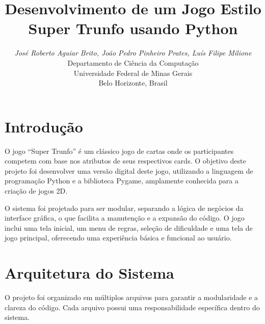 \documentclass[a4paper, twocolumn]{article}
\title{\textbf{Desenvolvimento de um Jogo Estilo Super Trunfo usando Python}}
\author{
  \textit{José Roberto Aguiar Brito, João Pedro Pinheiro Prates, Luís Filipe Milione} \\
  Departamento de Ciência da Computação \\
  Universidade Federal de Minas Gerais \\
  Belo Horizonte, Brasil \\
}
\date{} %
\begin{document}


\section{Introdução}
O jogo ``Super Trunfo'' é um clássico jogo de cartas onde os participantes competem com base nos atributos de seus respectivos cards. O objetivo deste projeto foi desenvolver uma versão digital deste jogo, utilizando a linguagem de programação Python e a biblioteca Pygame, amplamente conhecida para a criação de jogos 2D.

O sistema foi projetado para ser modular, separando a lógica de negócios da interface gráfica, o que facilita a manutenção e a expansão do código. O jogo inclui uma tela inicial, um menu de regras, seleção de dificuldade e uma tela de jogo principal, oferecendo uma experiência básica e funcional ao usuário.

\section{Arquitetura do Sistema}
O projeto foi organizado em múltiplos arquivos para garantir a modularidade e a clareza do código. Cada arquivo possui uma responsabilidade específica dentro do sistema.
\end{document}
